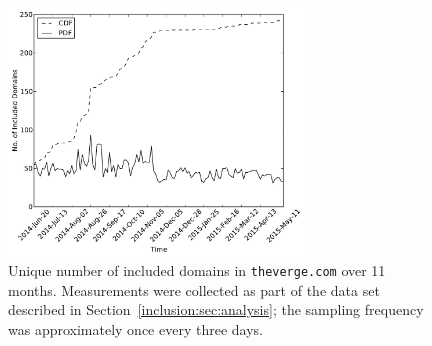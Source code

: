 \begin{figure}[t]
    \centering
    \includegraphics[width=0.7\textwidth]{inclusion/figures/included_domains}
    \caption{Unique number of included domains in \texttt{theverge.com} over 11 months. Measurements were collected as part of the data set described in Section~\ref{inclusion:sec:analysis}; the sampling frequency was approximately once every three days.}
    \label{inclusion:fig:included_domains}
\end{figure}
